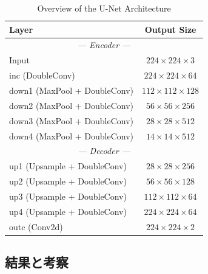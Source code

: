 \documentclass[10pt, a4paper, twocolumn]{jarticle}
\begin{document}
\begin{table}[htb]
  \centering
  \caption{Overview of the U-Net Architecture}
  \label{tab:unet_architecture}
  \begin{tabular}{lc}
    \toprule
    \textbf{Layer} & \textbf{Output Size} \\
    \midrule
    \multicolumn{2}{c}{\textit{--- Encoder ---}} \\
    Input & $224 \times 224 \times 3$ \\
    inc (DoubleConv) & $224 \times 224 \times 64$\\
    down1 (MaxPool + DoubleConv) & $112 \times 112 \times 128$ \\
    down2 (MaxPool + DoubleConv) & $56 \times 56 \times 256$ \\
    down3 (MaxPool + DoubleConv) & $28 \times 28 \times 512$ \\
    down4 (MaxPool + DoubleConv) & $14 \times 14 \times 512$ \\
    \midrule
    \multicolumn{2}{c}{\textit{--- Decoder ---}} \\
    up1 (Upsample + DoubleConv) & $28 \times 28 \times 256$ \\
    up2 (Upsample + DoubleConv) & $56 \times 56 \times 128$ \\
    up3 (Upsample + DoubleConv) & $112 \times 112 \times 64$ \\
    up4 (Upsample + DoubleConv) & $224 \times 224 \times 64$ \\
    \midrule
    outc (Conv2d) & $224 \times 224 \times 2$ \\
    \bottomrule
  \end{tabular}
\end{table}

\subsection{結果と考察}
\end{document}
